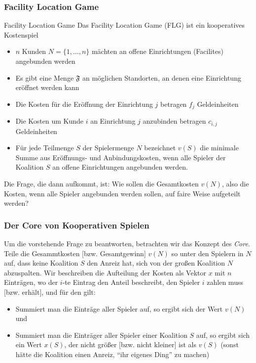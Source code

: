 \documentclass{panikzettel}
\begin{document}
{\subsubsection{Facility Location Game}

\begin{defi}{Facility Location Game}
	Das Facility Location Game (FLG) ist ein kooperatives Kostenspiel
	
	\begin{itemize}
		\item $n$ Kunden $N = \{1, \dots, n\}$ mächten an offene Einrichtungen (Facilites) angebunden werden
		\item Es gibt eine Menge $\mathfrak{F}$ an möglichen Standorten, an denen eine Einrichtung eröffnet werden kann
		\item Die Kosten für die Eröffnung der Einrichtung $j$ betragen $f_j$ Geldeinheiten
		\item Die Kosten um Kunde $i$ an Einrichtung $j$ anzubinden betragen $c_{i,j}$ Geldeinheiten
		\item Für jede Teilmenge $S$ der Spielermenge $N$ bezeichnet $v(S)$ die minimale Summe aus Eröffnungs- und Anbindungskosten, wenn alle Spieler der Koalition $S$ an offene Einrichtungen angebunden werden.
	\end{itemize} 

	Die Frage, die dann aufkommt, ist: Wie sollen die Gesamtkosten $v(N)$, also die Kosten, wenn alle Spieler angebunden werden sollen, auf faire Weise aufgeteilt werden?
\end{defi}

\subsubsection{Der Core von Kooperativen Spielen}

Um die vorstehende Frage zu beantworten, betrachten wir das Konzept des \emph{Core}. Teile die Gesammtkosten [bzw. Gesamtgewinn] $v(N)$ so unter den Spielern in $N$ auf, dass keine Koalition $S$ den Anreiz hat, sich von der großen Koalition $N$ abzuspalten. Wir beschreiben die Aufteilung der Kosten als Vektor $x$ mit $n$ Einträgen, wo der $i$-te Eintrag den Anteil beschreibt, den Spieler $i$ zahlen muss [bzw. erhält], und für den gilt:

\begin{itemize}
	\item Summiert man die Einträge aller Spieler auf, so ergibt sich der Wert $v(N)$ und
	\item Summiert man die Einträger aller Spieler einer Koalition $S$ auf, so ergibt sich ein Wert $x(S)$, der nicht größer [bzw. nicht kleiner] ist als $v(S)$ (sonst hätte die Koalition einen Anreiz, ``ihr eigenes Ding'' zu machen)
\end{itemize}	

}
\end{document}
